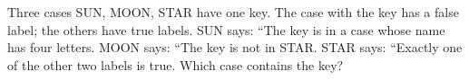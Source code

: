 Three cases SUN, MOON, STAR have one key. The case with the key has a false label; the others have true labels. SUN says: ``The key is in a case whose name has four letters. MOON says: ``The key is not in STAR. STAR says: ``Exactly one of the other two labels is true. Which case contains the key?
